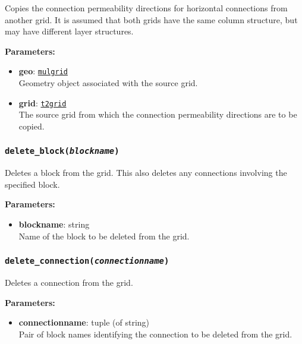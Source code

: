 Copies the connection permeability directions for horizontal connections from another grid.  It is assumed that both grids have the same column structure, but may have different layer structures.

\textbf{Parameters:}
\begin{itemize}
\item \textbf{geo}: \hyperref[mulgrids]{\texttt{mulgrid}}\\
  Geometry object associated with the source grid.
\item \textbf{grid}: \hyperref[t2grids]{\texttt{t2grid}}\\
  The source grid from which the connection permeability directions are to be copied.
\end{itemize}

\begin{snugshade}
\subsubsection{\texttt{delete\_block(\emph{blockname})}}
\end{snugshade}
\label{sec:t2grid:delete_block}

Deletes a block from the grid.  This also deletes any connections involving the specified block.

\textbf{Parameters:}
\begin{itemize}
\item \textbf{blockname}: string\\
  Name of the block to be deleted from the grid.
\end{itemize}

\begin{snugshade}
\subsubsection{\texttt{delete\_connection(\emph{connectionname})}}
\end{snugshade}
\label{sec:t2grid:delete_connection}

Deletes a connection from the grid.

\textbf{Parameters:}
\begin{itemize}
\item \textbf{connectionname}: tuple (of string)\\
  Pair of block names identifying the connection to be deleted from the grid.
\end{itemize}

